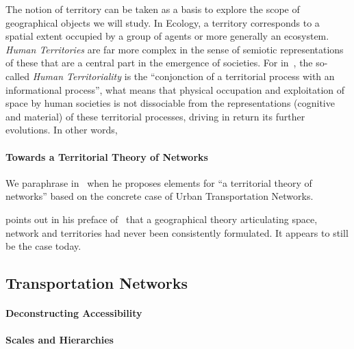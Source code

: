 The notion of territory can be taken as a basis to explore the scope of geographical objects we will study. In Ecology, a territory corresponds to a spatial extent occupied by a group of agents or more generally an ecosystem. \emph{Human Territories} are far more complex in the sense of semiotic representations of these that are a central part in the emergence of societies. For  in~\cite{raffestin1988reperes}, the so-called \emph{Human Territoriality} is the ``conjonction of a territorial process with an informational process'', what means that physical occupation and exploitation of space by human societies is not dissociable from the representations (cognitive and material) of these territorial processes, driving in return its further evolutions. In other words, 

\paragraph{Towards a Territorial Theory of Networks}

We paraphrase  in~\cite{dupuy1987vers} when he proposes elements for ``a territorial theory of networks'' based on the concrete case of Urban Transportation Networks. 


 points out in his preface of~\cite{offner1996reseaux} that a geographical theory articulating space, network and territories had never been consistently formulated. It appears to still be the case today.



\subsection{Transportation Networks}


\paragraph{Deconstructing Accessibility}



\paragraph{Scales and Hierarchies}





